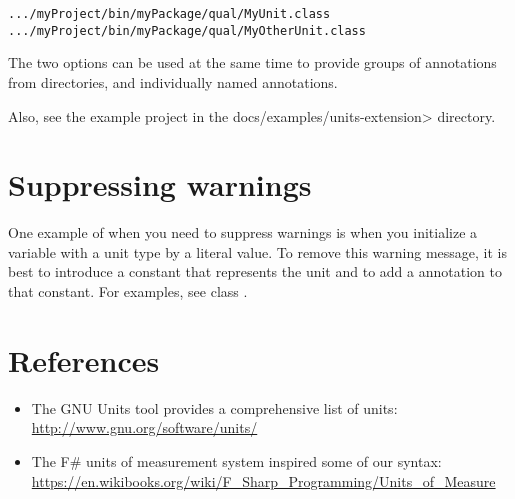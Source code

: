 \begin{itemize}
\begin{alltt}
  .../myProject/bin/myPackage/qual/MyUnit.class
  .../myProject/bin/myPackage/qual/MyOtherUnit.class
\end{alltt}

The two options can be used at the same time to provide groups of annotations
from directories, and individually named annotations.

\end{itemize}

Also, see the example project in the \<docs/examples/units-extension> directory.



\section{Suppressing warnings\label{units-suppressing}}

One example of when you need to suppress warnings is when you
initialize a variable with a unit type by a literal value.
To remove this warning message, it is best to introduce a
constant that represents the unit and to
add a 
annotation to that constant.
For examples, see class .


\section{References\label{units-references}}

\begin{itemize}
\item The GNU Units tool provides a comprehensive list of units:\\
  \url{http://www.gnu.org/software/units/}

\item The F\# units of measurement system inspired some of our syntax:\\
  \url{https://en.wikibooks.org/wiki/F_Sharp_Programming/Units_of_Measure}

\end{itemize}


